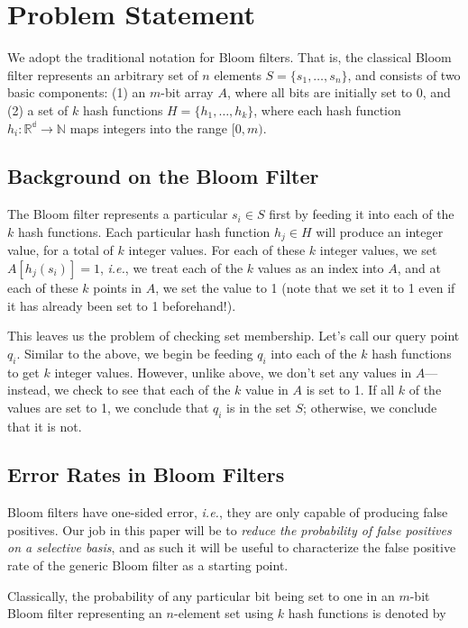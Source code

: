 \documentclass[11pt]{article}
\begin{document}
\section{Problem Statement}

We adopt the traditional notation for Bloom filters. That is, the classical Bloom filter represents an arbitrary set of $n$ elements $S = \{ s_1, \ldots, s_n \}$, and consists of two basic components: (1) an $m$-bit array $A$, where all bits are initially set to 0, and (2) a set of $k$ hash functions $H = \{ h_1, \ldots, h_k \}$, where each hash function $h_i : \mathbb{R^d} \rightarrow \mathbb{N}$ maps integers into the range $[0,m)$.

\subsection{Background on the Bloom Filter}

The Bloom filter represents a particular $s_i \in S$ first by feeding it into each of the $k$ hash functions. Each particular hash function $h_j \in H$ will produce an integer value, for a total of $k$ integer values. For each of these $k$ integer values, we set $A[h_j(s_i)] = 1$, \textit{i.e.}, we treat each of the $k$ values as an index into $A$, and at each of these $k$ points in $A$, we set the value to 1 (note that we set it to 1 even if it has already been set to 1 beforehand!).

This leaves us the problem of checking set membership. Let's call our query point $q_i$. Similar to the above, we begin be feeding $q_i$ into each of the $k$ hash functions to get $k$ integer values. However, unlike above, we don't set any values in $A$---instead, we check to see that each of the $k$ value in $A$ is set to 1. If all $k$ of the values are set to 1, we conclude that $q_i$ is in the set $S$; otherwise, we conclude that it is not.

\subsection{Error Rates in Bloom Filters}

Bloom filters have one-sided error, \textit{i.e.}, they are only capable of producing false positives. Our job in this paper will be to \textit{reduce the probability of false positives on a selective basis}, and as such it will be useful to characterize the false positive rate of the generic Bloom filter as a starting point.

Classically, the probability of any particular bit being set to one in an $m$-bit Bloom filter representing an $n$-element set using $k$ hash functions is denoted by
\end{document}
